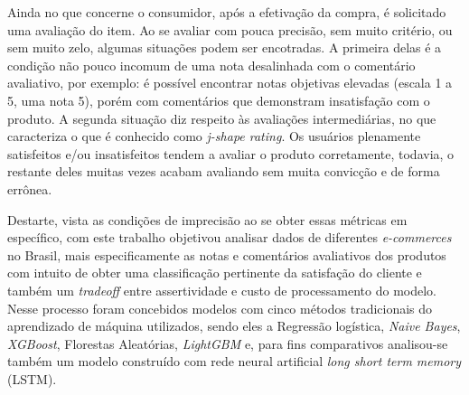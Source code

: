 Ainda no que concerne o consumidor, após a efetivação da compra, é solicitado uma avaliação do item. Ao se avaliar com pouca precisão, sem muito critério, ou sem muito zelo, algumas situações podem ser encotradas. A primeira delas é a condição não pouco incomum de uma nota desalinhada com o comentário avaliativo, por exemplo: é possível encontrar notas objetivas elevadas (escala 1 a 5, uma nota 5), porém com comentários que demonstram insatisfação com o produto. A segunda situação diz respeito às avaliações intermediárias, no que caracteriza o que é conhecido como \textit{j-shape rating}. Os usuários plenamente satisfeitos e/ou insatisfeitos tendem a avaliar o produto corretamente, todavia, o restante deles muitas vezes acabam avaliando sem muita convicção e de forma errônea.

Destarte, vista as condições de imprecisão ao se obter essas métricas em específico, com este trabalho objetivou analisar dados de diferentes \textit{e-commerces} no Brasil, mais especificamente as notas e comentários avaliativos dos produtos com intuito de obter uma classificação pertinente da satisfação do cliente e também um \textit{tradeoff} entre assertividade e custo de processamento do modelo. Nesse processo foram concebidos modelos com cinco métodos tradicionais do aprendizado de máquina utilizados, sendo eles a Regressão logística, \textit{Naive Bayes}, \textit{XGBoost}, Florestas Aleatórias, \textit{LightGBM} e, para fins comparativos analisou-se também um modelo construído com rede neural artificial \textit{long short term memory} (LSTM).
